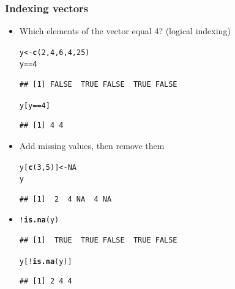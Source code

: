 \documentclass[color=usenames,dvipsnames]{beamer}\usepackage[]{graphicx}\usepackage[]{color}
\makeatletter
\newcommand{\hlnum}[1]{\textcolor[rgb]{0.686,0.059,0.569}{#1}}%
\newcommand{\hlopt}[1]{\textcolor[rgb]{0,0,0}{#1}}%
\newcommand{\hlstd}[1]{\textcolor[rgb]{0.345,0.345,0.345}{#1}}%
\newcommand{\hlkwb}[1]{\textcolor[rgb]{0.69,0.353,0.396}{#1}}%
\newcommand{\hlkwd}[1]{\textcolor[rgb]{0.737,0.353,0.396}{\textbf{#1}}}%
\newenvironment{kframe}{%
 \def\at@end@of@kframe{}%
 \ifinner\ifhmode%
  \def\at@end@of@kframe{\end{minipage}}%
  \begin{minipage}{\columnwidth}%
 \fi\fi%
 \def\FrameCommand##1{\hskip\@totalleftmargin \hskip-\fboxsep
 \colorbox{shadecolor}{##1}\hskip-\fboxsep
     \hskip-\linewidth \hskip-\@totalleftmargin \hskip\columnwidth}%
 \MakeFramed {\advance\hsize-\width
   \@totalleftmargin\z@ \linewidth\hsize
   \@setminipage}}%
 {\par\unskip\endMakeFramed%
 \at@end@of@kframe}
\newenvironment{knitrout}{}{} %
\makeatother
\begin{document}
\begin{frame}[fragile]
  \frametitle{Indexing vectors}
\begin{itemize}[<+->]
  \item Which elements of the vector equal 4? (logical indexing)
\begin{knitrout}
\color{fgcolor}\begin{kframe}
\begin{alltt}
\hlstd{y} \hlkwb{<-} \hlkwd{c}\hlstd{(}\hlnum{2}\hlstd{,} \hlnum{4}\hlstd{,} \hlnum{6}\hlstd{,} \hlnum{4}\hlstd{,} \hlnum{25}\hlstd{)}
\hlstd{y} \hlopt{==} \hlnum{4}
\end{alltt}
\begin{verbatim}
## [1] FALSE  TRUE FALSE  TRUE FALSE
\end{verbatim}
\begin{alltt}
\hlstd{y[y} \hlopt{==} \hlnum{4}\hlstd{]}
\end{alltt}
\begin{verbatim}
## [1] 4 4
\end{verbatim}
\end{kframe}
\end{knitrout}
  \item Add missing values, then remove them
\begin{knitrout}
\color{fgcolor}\begin{kframe}
\begin{alltt}
\hlstd{y[}\hlkwd{c}\hlstd{(}\hlnum{3}\hlstd{,}\hlnum{5}\hlstd{)]} \hlkwb{<-} \hlnum{NA}
\hlstd{y}
\end{alltt}
\begin{verbatim}
## [1]  2  4 NA  4 NA
\end{verbatim}
\end{kframe}
\end{knitrout}
  \item[]
\begin{knitrout}
\color{fgcolor}\begin{kframe}
\begin{alltt}
\hlopt{!}\hlkwd{is.na}\hlstd{(y)}
\end{alltt}
\begin{verbatim}
## [1]  TRUE  TRUE FALSE  TRUE FALSE
\end{verbatim}
\begin{alltt}
\hlstd{y[}\hlopt{!}\hlkwd{is.na}\hlstd{(y)]}
\end{alltt}
\begin{verbatim}
## [1] 2 4 4
\end{verbatim}
\end{kframe}
\end{knitrout}
\end{itemize}
\end{frame}
\end{document}
